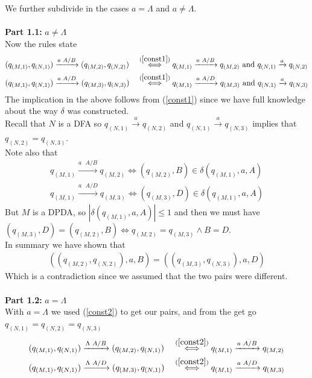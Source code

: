 \documentclass{article}
\theoremstyle{remark}
\numberwithin{equation}{section}
\begin{document}
We further subdivide in the cases $a=\Lambda$ and $a\neq\Lambda$.\\
\\\textbf{Part 1.1:} $a\neq\Lambda$
\\ Now the rules state
\begin{align*}
	&(q_{(M,1)},q_{(N,1)}) \xrightarrow{a\text{ }A/B}(q_{(M,2)},q_{(N,2)}) &&\stackrel{(\ref{const1})}{\iff} q_{(M,1)}\xrightarrow{a\text{ }A/B}q_{(M,2)}\text{ and }q_{(N,1)}\xrightarrow{a}q_{(N,2)}\\
	&(q_{(M,1)},q_{(N,1)}) \xrightarrow{a\text{ }A/D}(q_{(M,3)},q_{(N,3)}) &&\stackrel{(\ref{const1})}{\iff} q_{(M,1)}\xrightarrow{a\text{ }A/D}q_{(M,3)}\text{ and }q_{(N,1)}\xrightarrow{a}q_{(N,3)}
\end{align*}
The implication in the above follows from (\ref{const1}) since we have full knowledge about the way $\delta$ was constructed.\\
Recall that $N$ is a DFA so $q_{(N,1)}\xrightarrow{a}q_{(N,2)}$ and $q_{(N,1)}\xrightarrow{a}q_{(N,3)}$ implies that $q_{(N,2)}=q_{(N,3)}$.\\
Note also that
\begin{align*}
	q_{(M,1)}\xrightarrow{a\text{ }A/B}q_{(M,2)}\iff (q_{(M,2)},B)\in\delta(q_{(M,1)},a,A)\\
	q_{(M,1)}\xrightarrow{a\text{ }A/D}q_{(M,3)}\iff (q_{(M,3)},D)\in\delta(q_{(M,1)},a,A)
\end{align*}
But $M$ is a DPDA, so $|\delta(q_{(M,1)},a,A)|\leq 1$ and then we must have $(q_{(M,3)},D) = (q_{(M,2)},B) \iff q_{(M,2)}=q_{(M,3)}\wedge B=D$.\\
In summary we have shown that
\begin{align*}
	((q_{(M,2)},q_{(N,2)}),a,B)=((q_{(M,3)},q_{(N,3)}),a,D)
\end{align*}
Which is a contradiction since we assumed that the two pairs were different.\\
\\\textbf{Part 1.2:} $a =\Lambda$\\
With $a=\Lambda$ we used (\ref{const2}) to get our pairs, and from the get go $q_{(N,1)}=q_{(N,2)}=q_{(N,3)}$
\begin{align*}
&(q_{(M,1)},q_{(N,1)}) \xrightarrow{\Lambda\text{ }A/B}(q_{(M,2)},q_{(N,1)}) &&\stackrel{(\ref{const2})}{\iff} q_{(M,1)}\xrightarrow{a\text{ }A/B}q_{(M,2)}\\
&(q_{(M,1)},q_{(N,1)}) \xrightarrow{\Lambda\text{ }A/D}(q_{(M,3)},q_{(N,1)}) &&\stackrel{(\ref{const2})}{\iff} q_{(M,1)}\xrightarrow{a\text{ }A/D}q_{(M,3)}
\end{align*}
\end{document}
